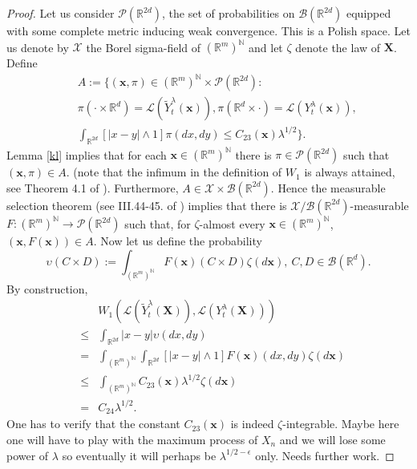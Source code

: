 \documentclass[a4paper,draft]{article}
\begin{document}
\begin{proof}
Let us consider $\mathcal{P}(\mathbb{R}^{2d})$, the set of 
probabilities on $\mathcal{B}(\mathbb{R}^{2d})$ equipped with some complete
metric inducing weak convergence. This is a Polish space.
Let us denote by $\mathcal{X}$ the Borel sigma-field of $(\mathbb{R}^m)^{\mathbb{N}}$
and let $\zeta$ denote the law of $\mathbf{X}$.
Define
\begin{eqnarray*}
& & A:=\{(\mathbf{x},\pi)\in (\mathbb{R}^m)^{\mathbb{N}}\times\mathcal{P}(\mathbb{R}^{2d}):\\
& & \pi(\cdot\times\mathbb{R}^d)=\mathcal{L}(\tilde{Y}^{\lambda}_t(\mathbf{x})),
\pi(\mathbb{R}^d\times\cdot)=\mathcal{L}(Y^{\lambda}_t(\mathbf{x})),\\
& & \int_{\mathbb{R}^{2d}} [|x-y|\wedge 1]\pi(dx,dy)\leq C_{23}(\mathbf{x})\lambda^{1/2}\}.
\end{eqnarray*} 
Lemma \ref{kl} implies that for each $\mathbf{x}\in(\mathbb{R}^{m})^{\mathbb{N}}$
there is $\pi\in\mathcal{P}(\mathbb{R}^{2d})$ such that $(\mathbf{x},\pi)\in A$.
(note that the infimum in the definition of $W_1$ is always attained, see Theorem 4.1 of \cite{villani}).
Furthermore, $A\in\mathcal{X}\times \mathcal{B}(\mathbb{R}^{2d})$.
Hence the measurable selection theorem (see III.44-45. of \cite{dm})
implies that there is $\mathcal{X}/\mathcal{B}(\mathbb{R}^{2d})$-measurable 
$F:(\mathbb{R}^m)^{\mathbb{N}}\to \mathcal{P}(\mathbb{R}^{2d})$ such that,
for $\zeta$-almost every $\mathbf{x}\in (\mathbb{R}^m)^{\mathbb{N}}$,
$(\mathbf{x},F(\mathbf{x}))\in A$. Now let us define the probability
$$
\upsilon(C\times D):= \int_{(\mathbb{R}^m)^{\mathbb{N}}}
F(\mathbf{x})(C\times D)\zeta(d\mathbf{x}),\ C,D\in\mathcal{B}(\mathbb{R}^{d}).
$$
By construction,
\begin{eqnarray*}
& & W_1(\mathcal{L}(\tilde{Y}^{\lambda}_t(\mathbf{X})),
\mathcal{L}(Y^{\lambda}_t(\mathbf{X})))\\
&\leq& \int_{\mathbb{R}^{2d}}|x-y|\upsilon(dx,dy)\\
&=& \int_{(\mathbb{R}^m)^{\mathbb{N}}} \int_{\mathbb{R}^{2d}} [|x-y|\wedge 1]F(\mathbf{x})(dx,dy)
\zeta(d\mathbf{x})\\
&\leq &  \int_{(\mathbb{R}^m)^{\mathbb{N}}} C_{23}(\mathbf{x})\lambda^{1/2} \zeta(d\mathbf{x})\\
&=& C_{24}\lambda^{1/2}.
\end{eqnarray*}
One has to verify that the constant $C_{23}(\mathbf{x})$ is indeed $\zeta$-integrable. Maybe here one
will have to play with the maximum process of $X_n$ and we will lose some power of $\lambda$ so
eventually it will perhaps be $\lambda^{1/2-\epsilon}$ only. Needs further work.
\end{proof}
\end{document}
